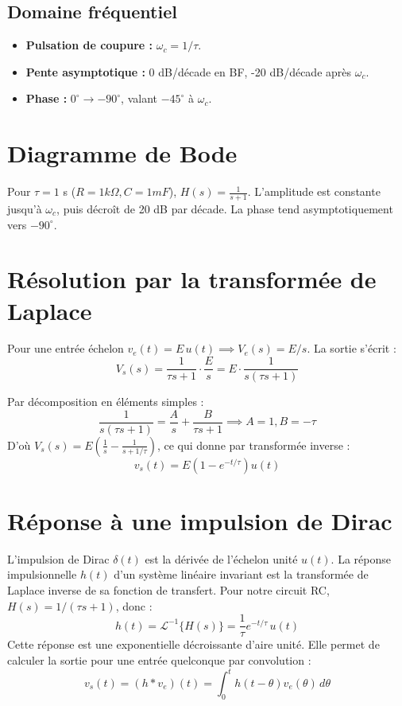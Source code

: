 \documentclass[12pt,a4paper]{article}
\begin{document}
	\subsection{Domaine fréquentiel}
	\begin{itemize}
		\item \textbf{Pulsation de coupure :} $\omega_c = 1/\tau$.
		\item \textbf{Pente asymptotique :} 0 dB/décade en BF, -20 dB/décade après $\omega_c$.
		\item \textbf{Phase :} $0^\circ \to -90^\circ$, valant $-45^\circ$ à $\omega_c$.
	\end{itemize}
	
	\section{Diagramme de Bode}
	Pour $\tau = 1$ s ($R=1k\Omega, C=1mF$), $H(s) = \frac{1}{s+1}$. L'amplitude est constante jusqu'à $\omega_c$, puis décroît de 20 dB par décade. La phase tend asymptotiquement vers $-90^\circ$.
	
	\section{Résolution par la transformée de Laplace}
	Pour une entrée échelon $v_e(t) = E \, u(t) \implies V_e(s) = E/s$. La sortie s'écrit :
	\begin{equation*}
	V_s(s) = \frac{1}{\tau s + 1} \cdot \frac{E}{s} = E \cdot \frac{1}{s(\tau s + 1)}
	\end{equation*}
	
	Par décomposition en éléments simples :
	\begin{equation*}
	\frac{1}{s(\tau s + 1)} = \frac{A}{s} + \frac{B}{\tau s + 1} \implies A=1, B=-\tau
	\end{equation*}
	D'où $V_s(s) = E \left( \frac{1}{s} - \frac{1}{s + 1/\tau} \right)$, ce qui donne par transformée inverse :
	\begin{equation}
	v_s(t) = E(1 - e^{-t/\tau}) u(t)
	\end{equation}
	
	\newpage
	\section{Réponse à une impulsion de Dirac}
	L'impulsion de Dirac $\delta(t)$ est la dérivée de l'échelon unité $u(t)$. La réponse impulsionnelle $h(t)$ d'un système linéaire invariant est la transformée de Laplace inverse de sa fonction de transfert.
	Pour notre circuit RC, $H(s) = 1/(\tau s + 1)$, donc :
	\begin{equation}
	h(t) = \mathcal{L}^{-1}\{H(s)\} = \frac{1}{\tau} e^{-t/\tau} \, u(t)
	\end{equation}
	Cette réponse est une exponentielle décroissante d'aire unité. Elle permet de calculer la sortie pour une entrée quelconque par convolution :
	\begin{equation}
	v_s(t) = (h * v_e)(t) = \int_0^t h(t-\theta) v_e(\theta) \, d\theta
	\end{equation}
	
\end{document}
